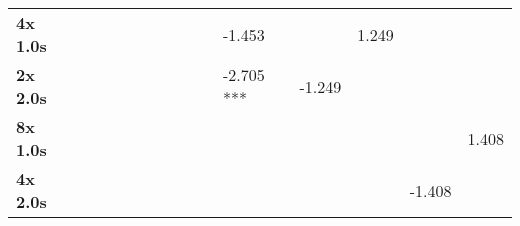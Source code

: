 \begin{tabular}{lllllllllllllll}
\textbf{4x 1.0s } &             &            &             &            &            &             &             &            &            &     -1.453  &          &     1.249  &          &         \\
\textbf{2x 2.0s } &             &            &             &            &            &             &             &            &            &  -2.705 *** &  -1.249  &            &          &         \\
\textbf{8x 1.0s } &             &            &             &            &            &             &             &            &            &             &          &            &          &  1.408  \\
\textbf{4x 2.0s } &             &            &             &            &            &             &             &            &            &             &          &            &  -1.408  &         \\
\bottomrule
\end{tabular}
